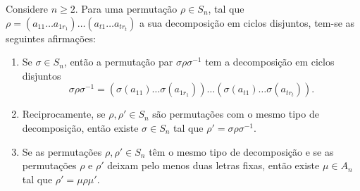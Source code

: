 \documentclass[11pt,openany]{book}
\begin{document}
\begin{lemma}
\label{lemma:decomposicao_permutacao}
    Considere $n \geq 2$. Para uma permutação $\rho \in S_n$, tal que $\rho = (a_{11} \dots a_{1r_1}) \dots (a_{t1} \dots a_{tr_t})$ a sua decomposição em ciclos disjuntos, tem-se as seguintes afirmações:
    \begin{enumerate}[label=\alph*)]
        \item Se $\sigma \in S_n$, então a permutação par $\sigma\rho\sigma^{-1}$ tem a decomposição em ciclos disjuntos
            \[\sigma\rho\sigma^{-1} = (\sigma(a_{11})\dots\sigma(a_{1r_1}))\dots(\sigma(a_{t1})\dots\sigma(a_{tr_t})).\]
        \item Reciprocamente, se $\rho, \rho' \in S_n$ são permutações com o mesmo tipo de decomposição, então existe $\sigma \in S_n$ tal que $\rho' = \sigma\rho\sigma^{-1}$.
        \item Se as permutações $\rho, \rho' \in S_n$ têm o mesmo tipo de decomposição e se as permutações $\rho$ e $\rho'$ deixam pelo menos duas letras fixas, então existe $\mu \in A_n$ tal que $\rho' = \mu\rho\mu'$.
    \end{enumerate}
\end{lemma}
\end{document}
